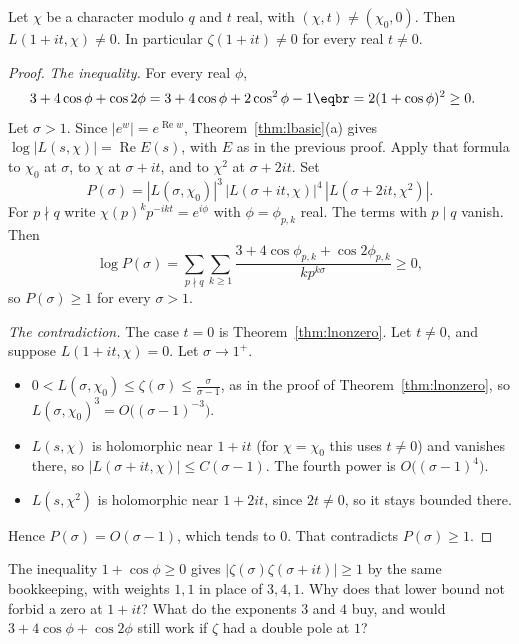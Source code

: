 \begin{theorem}\label{thm:line}
Let $\chi$ be a character modulo $q$ and $t$ real, with $(\chi,t)\ne(\chi_0,0)$. Then $L(1+it,\chi)\ne0$. In particular $\zeta(1+it)\ne0$ for every real $t\ne0$.
\end{theorem}
\begin{proof}
\emph{The inequality.} For every real $\phi$,
\[
\begin{aligned}3+4\cos\phi+\cos2\phi&=3+4\cos\phi+2\cos^2\phi-1\eqbr=2(1+\cos\phi)^2\ge0.\end{aligned}
\]
Let $\sigma>1$. Since $|e^w|=e^{\operatorname{Re}w}$, Theorem~\ref{thm:lbasic}(a) gives $\log|L(s,\chi)|=\operatorname{Re}E(s)$, with $E$ as in the previous proof. Apply that formula to $\chi_0$ at $\sigma$, to $\chi$ at $\sigma+it$, and to $\chi^2$ at $\sigma+2it$. Set
\[
P(\sigma)=|L(\sigma,\chi_0)|^3\,|L(\sigma+it,\chi)|^4\,|L(\sigma+2it,\chi^2)|.
\]
For $p\nmid q$ write $\chi(p)^k p^{-ikt}=e^{i\phi}$ with $\phi=\phi_{p,k}$ real. The terms with $p\mid q$ vanish. Then
\[
\log P(\sigma)=\sum_{p\nmid q}\sum_{k\ge1}\frac{3+4\cos\phi_{p,k}+\cos2\phi_{p,k}}{kp^{k\sigma}}\ge0,
\]
so $P(\sigma)\ge1$ for every $\sigma>1$.

\emph{The contradiction.} The case $t=0$ is Theorem~\ref{thm:lnonzero}. Let $t\ne0$, and suppose $L(1+it,\chi)=0$. Let $\sigma\to1^+$.
\begin{itemize}
\item $0<L(\sigma,\chi_0)\le\zeta(\sigma)\le\frac\sigma{\sigma-1}$, as in the proof of Theorem~\ref{thm:lnonzero}, so $L(\sigma,\chi_0)^3=O\bigl((\sigma-1)^{-3}\bigr)$.
\item $L(s,\chi)$ is holomorphic near $1+it$ (for $\chi=\chi_0$ this uses $t\ne0$) and vanishes there, so $|L(\sigma+it,\chi)|\le C(\sigma-1)$. The fourth power is $O\bigl((\sigma-1)^4\bigr)$.
\item $L(s,\chi^2)$ is holomorphic near $1+2it$, since $2t\ne0$, so it stays bounded there.
\end{itemize}
Hence $P(\sigma)=O(\sigma-1)$, which tends to $0$. That contradicts $P(\sigma)\ge1$.
\end{proof}

\begin{think}
The inequality $1+\cos\phi\ge0$ gives $|\zeta(\sigma)\zeta(\sigma+it)|\ge1$ by the same bookkeeping, with weights $1,1$ in place of $3,4,1$. Why does that lower bound not forbid a zero at $1+it$? What do the exponents $3$ and $4$ buy, and would $3+4\cos\phi+\cos2\phi$ still work if $\zeta$ had a double pole at $1$?
\end{think}

